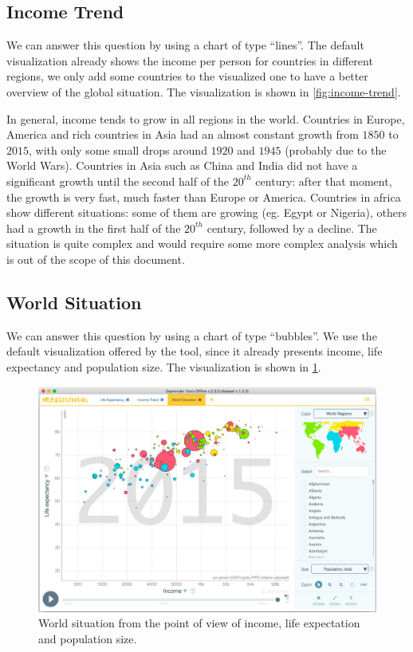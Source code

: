 \subsection{Income Trend}
We can answer this question by using a chart of type ``lines''.
The default visualization already shows the income per person for countries in different regions,
we only add some countries to the visualized one to have a better overview of the global situation.
The visualization is shown in \cref{fig:income-trend}.

In general, income tends to grow in all regions in the world.
Countries in Europe, America and rich countries in Asia had an almost constant growth from $1850$ to $2015$, with only some small drops around $1920$ and $1945$ (probably due to the World Wars).
Countries in Asia such as China and India did not have a significant growth until the second half of the $20^{th}$ century:
after that moment, the growth is very fast, much faster than Europe or America.
Countries in africa show different situations:
some of them are growing (eg. Egypt or Nigeria), others had a growth in the first half of the $20^{th}$ century, followed by a decline.
The situation is quite complex and would require some more complex analysis which is out of the scope of this document.


\subsection{World Situation}
We can answer this question by using a chart of type ``bubbles''.
We use the default visualization offered by the tool, since it already presents income, life expectancy and population size.
The visualization is shown in \cref{fig:world-situation}.

\begin{figure}[h]
	\centering
	\includegraphics[width=0.95\columnwidth]{figures/world-situation}
	\caption{World situation from the point of view of income, life expectation and population size.}
	\label{fig:world-situation}
\end{figure}

